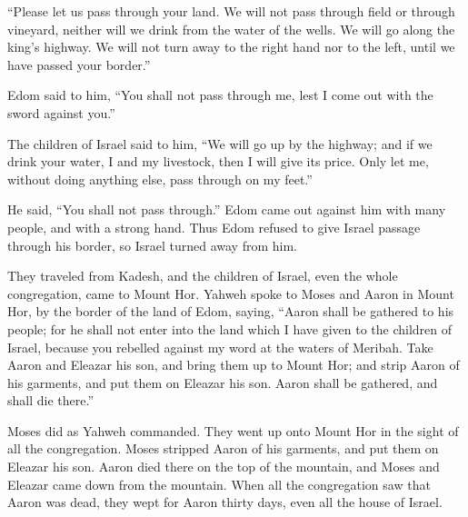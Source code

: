 {\par }{\PP {}“Please let us pass through your land. We will not pass through field or through vineyard, neither will we drink from the water of the wells. We will go along the king’s highway. We will not turn away to the right hand nor to the left, until we have passed your border.”
\par }{\PP {}Edom said to him, “You shall not pass through me, lest I come out with the sword against you.”
\par }{\PP {}The children of Israel said to him, “We will go up by the highway; and if we drink your water, I and my livestock, then I will give its price. Only let me, without doing anything else, pass through on my feet.”
\par }{\PP {}He said, “You shall not pass through.” Edom came out against him with many people, and with a strong hand.
Thus Edom refused to give Israel passage through his border, so Israel turned away from him.
\par }{\PP {}They traveled from Kadesh, and the children of Israel, even the whole congregation, came to Mount Hor.
Yahweh spoke to Moses and Aaron in Mount Hor, by the border of the land of Edom, saying,
“Aaron shall be gathered to his people; for he shall not enter into the land which I have given to the children of Israel, because you rebelled against my word at the waters of Meribah.
Take Aaron and Eleazar his son, and bring them up to Mount Hor;
and strip Aaron of his garments, and put them on Eleazar his son. Aaron shall be gathered, and shall die there.”
\par }{\PP {}Moses did as Yahweh commanded. They went up onto Mount Hor in the sight of all the congregation.
Moses stripped Aaron of his garments, and put them on Eleazar his son. Aaron died there on the top of the mountain, and Moses and Eleazar came down from the mountain.
When all the congregation saw that Aaron was dead, they wept for Aaron thirty days, even all the house of Israel.

}
